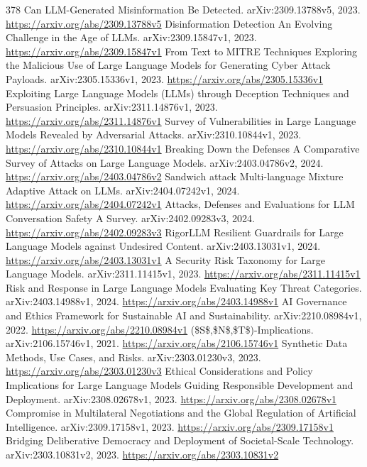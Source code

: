 \documentclass[11pt]{article}
\begin{document}
\begin{thebibliography}{378}
 Can LLM-Generated Misinformation Be Detected. arXiv:2309.13788v5, 2023. \url{https://arxiv.org/abs/2309.13788v5}
 Disinformation Detection An Evolving Challenge in the Age of LLMs. arXiv:2309.15847v1, 2023. \url{https://arxiv.org/abs/2309.15847v1}
 From Text to MITRE Techniques Exploring the Malicious Use of Large Language Models for Generating Cyber Attack Payloads. arXiv:2305.15336v1, 2023. \url{https://arxiv.org/abs/2305.15336v1}
 Exploiting Large Language Models (LLMs) through Deception Techniques and Persuasion Principles. arXiv:2311.14876v1, 2023. \url{https://arxiv.org/abs/2311.14876v1}
 Survey of Vulnerabilities in Large Language Models Revealed by Adversarial Attacks. arXiv:2310.10844v1, 2023. \url{https://arxiv.org/abs/2310.10844v1}
 Breaking Down the Defenses A Comparative Survey of Attacks on Large Language Models. arXiv:2403.04786v2, 2024. \url{https://arxiv.org/abs/2403.04786v2}
 Sandwich attack Multi-language Mixture Adaptive Attack on LLMs. arXiv:2404.07242v1, 2024. \url{https://arxiv.org/abs/2404.07242v1}
 Attacks, Defenses and Evaluations for LLM Conversation Safety A Survey. arXiv:2402.09283v3, 2024. \url{https://arxiv.org/abs/2402.09283v3}
 RigorLLM Resilient Guardrails for Large Language Models against Undesired Content. arXiv:2403.13031v1, 2024. \url{https://arxiv.org/abs/2403.13031v1}
 A Security Risk Taxonomy for Large Language Models. arXiv:2311.11415v1, 2023. \url{https://arxiv.org/abs/2311.11415v1}
 Risk and Response in Large Language Models Evaluating Key Threat Categories. arXiv:2403.14988v1, 2024. \url{https://arxiv.org/abs/2403.14988v1}
 AI Governance and Ethics Framework for Sustainable AI and Sustainability. arXiv:2210.08984v1, 2022. \url{https://arxiv.org/abs/2210.08984v1}
 (\$S\$,\$N\$,\$T\$)-Implications. arXiv:2106.15746v1, 2021. \url{https://arxiv.org/abs/2106.15746v1}
 Synthetic Data Methods, Use Cases, and Risks. arXiv:2303.01230v3, 2023. \url{https://arxiv.org/abs/2303.01230v3}
 Ethical Considerations and Policy Implications for Large Language Models Guiding Responsible Development and Deployment. arXiv:2308.02678v1, 2023. \url{https://arxiv.org/abs/2308.02678v1}
 Compromise in Multilateral Negotiations and the Global Regulation of Artificial Intelligence. arXiv:2309.17158v1, 2023. \url{https://arxiv.org/abs/2309.17158v1}
 Bridging Deliberative Democracy and Deployment of Societal-Scale Technology. arXiv:2303.10831v2, 2023. \url{https://arxiv.org/abs/2303.10831v2}

\end{thebibliography}
\end{document}
